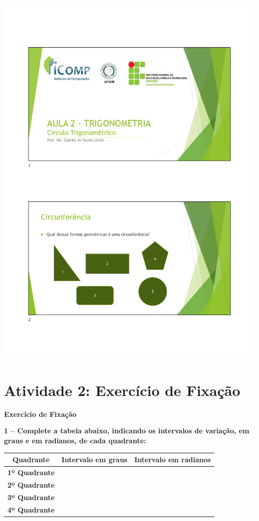 \includegraphics[width=\textwidth,page=17]{chapters/appendixLesson/Aula2.pdf}

\section{Atividade 2: Exercício de Fixação}\label{section:atividade2_fixação}

\begin{center}
	\textbf{\Large Exercício de Fixação}
\end{center}

\textbf{1 – Complete a tabela abaixo, indicando os intervalos de variação, em graus e em radianos, de cada quadrante:}

\begin{table}[htb]
	\centering
	\begin{tabular}{|l|l|l|}
		\hline
		\multicolumn{1}{|c|}{\textbf{Quadrante}} & \multicolumn{1}{c|}{\textbf{Intervalo em graus}} & \multicolumn{1}{c|}{\textbf{Intervalo em radianos}} \\ \hline
		\textbf{1º Quadrante} &  &  \\ \hline
		\textbf{2º Quadrante} &  &  \\ \hline
		\textbf{3º Quadrante} &  &  \\ \hline
		\textbf{4º Quadrante} &  &  \\ \hline
	\end{tabular}
\end{table}


